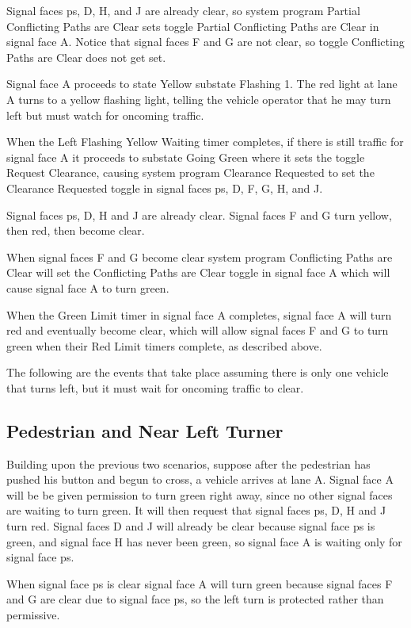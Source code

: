 \documentclass[letterpaper,twoside]{article}
\begin{document}
Signal faces ps, D, H, and J are already clear, so system program Partial
Conflicting Paths are Clear sets toggle Partial Conflicting Paths are Clear
in signal face A.
Notice that signal faces F and G are not clear, so toggle Conflicting Paths
are Clear does not get set.

Signal face A proceeds to state Yellow substate Flashing 1.  The red light
at lane A turns to a yellow flashing light, telling the vehicle operator
that he may turn left but must watch for oncoming traffic.

When the Left Flashing Yellow Waiting timer completes, if there is still
traffic for
signal face A it proceeds to substate Going Green where it sets the
toggle Request Clearance, causing system program Clearance Requested to
set the Clearance Requested toggle in signal faces ps, D, F, G, H, and J.

Signal faces ps, D, H and J are already clear.  Signal faces F and G turn
yellow, then red, then become clear.

When signal faces F and G become clear system program Conflicting Paths
are Clear will set the Conflicting Paths are Clear toggle in signal face
A which will cause signal face A to turn green.

When the Green Limit timer in signal face A completes, signal face
A will turn red and eventually become clear, which will allow
signal faces F and G to turn green when their Red Limit timers complete,
as described above.

The following are the events that take place assuming there is only
one vehicle that turns left, but it must wait for oncoming traffic
to clear.



\subsection{Pedestrian and Near Left Turner}

Building upon the previous two scenarios, suppose after the pedestrian
has pushed his button and begun to cross, a vehicle arrives at lane A.
Signal face A will be be given permission to turn green right away, since no
other signal faces are waiting to turn green.  It will then request
that signal faces ps, D, H and J turn red.  Signal faces D and J
will already be clear because signal face ps is green, and signal face
H has never been green, so signal face A is waiting only for signal face ps.

When signal face ps is clear signal face A will turn green because
signal faces F and G are clear due to signal face ps, so the left turn
is protected rather than permissive.
\end{document}
